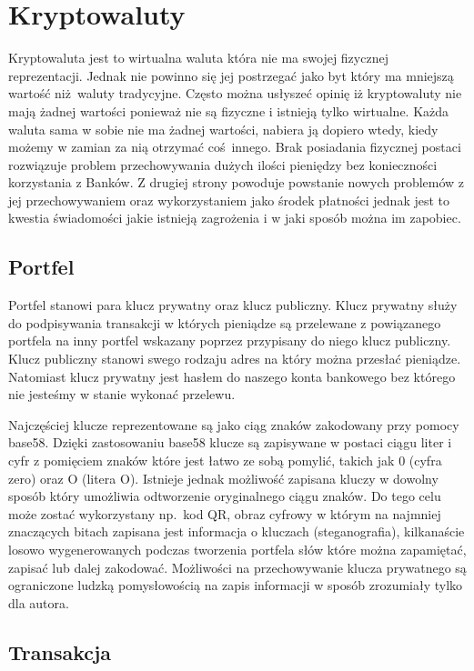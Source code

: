 \documentclass[journal,12pt,onecolumn,draftclsnofoot,]{IEEEtran}
\begin{document}
\section{Kryptowaluty}

Kryptowaluta jest to wirtualna waluta która nie ma swojej fizycznej reprezentacji. Jednak nie powinno się jej postrzegać
jako byt który ma mniejszą wartość niż waluty tradycyjne. Często można usłyszeć opinię iż kryptowaluty nie mają żadnej
wartości ponieważ nie są fizyczne i istnieją tylko wirtualne. Każda waluta sama w sobie nie ma żadnej wartości, nabiera
ją dopiero wtedy, kiedy możemy w zamian za nią otrzymać coś innego. Brak posiadania fizycznej postaci rozwiązuje problem
przechowywania dużych ilości pieniędzy bez konieczności korzystania z Banków. Z drugiej strony powoduje powstanie nowych
problemów z jej przechowywaniem oraz wykorzystaniem jako środek płatności jednak jest to kwestia świadomości jakie
istnieją zagrożenia i w jaki sposób można im zapobiec.

\subsection{Portfel}

Portfel stanowi para klucz prywatny oraz klucz publiczny. Klucz prywatny służy do podpisywania transakcji w których
pieniądze są przelewane z powiązanego portfela na inny portfel wskazany poprzez przypisany do niego klucz publiczny.
Klucz publiczny stanowi swego rodzaju adres na który można przesłać pieniądze. Natomiast klucz prywatny jest hasłem do
naszego konta bankowego bez którego nie jesteśmy w stanie wykonać przelewu.

Najczęściej klucze reprezentowane są jako ciąg znaków zakodowany przy pomocy base58. Dzięki zastosowaniu base58 klucze
są zapisywane w postaci ciągu liter i cyfr z pomięciem znaków które jest łatwo ze sobą pomylić, takich jak 0 (cyfra
zero) oraz O (litera O). Istnieje jednak możliwość zapisana kluczy w dowolny sposób który umożliwia odtworzenie
oryginalnego ciągu znaków. Do tego celu może zostać wykorzystany np.\ kod QR, obraz cyfrowy w którym na najmniej
znaczących bitach zapisana jest informacja o kluczach (steganografia), kilkanaście losowo wygenerowanych podczas
tworzenia portfela słów które można zapamiętać, zapisać lub dalej zakodować. Możliwości na przechowywanie klucza
prywatnego są ograniczone ludzką pomysłowością na zapis informacji w sposób zrozumiały tylko dla autora.

\subsection{Transakcja}
\end{document}
